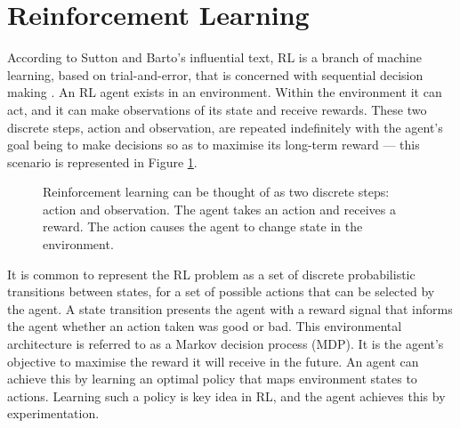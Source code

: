 \section{Reinforcement Learning}\label{sec:reinforcement_learning}
According to Sutton and Barto's influential text, RL is a branch of machine learning, based on trial-and-error, that is concerned with sequential decision making \cite{Sutton2018}. An RL agent exists in an environment. Within the environment it can act, and it can make observations of its state and receive rewards. These two discrete steps, action and observation, are repeated indefinitely with the agent's goal being to make decisions so as to maximise its long-term reward --- this scenario is represented in Figure \ref{fig:209_reinforcement_learning_problem}.

\begin{figure}[h]
	\centering
	
	\caption[Reinforcement learning model overview]{Reinforcement learning can be thought of as two discrete steps: action and observation. The agent takes an action and receives a reward. The action causes the agent to change state in the environment.}
	\label{fig:209_reinforcement_learning_problem}
\end{figure}

It is common to represent the RL problem as a set of discrete probabilistic transitions between states, for a set of possible actions that can be selected by the agent. A state transition presents the agent with a reward signal that informs the agent whether an action taken was good or bad. This environmental architecture is referred to as a Markov decision process (MDP). It is the agent's objective to maximise the reward it will receive in the future. An agent can achieve this by learning an optimal policy that maps environment states to actions. Learning such a policy is key idea in RL, and the agent achieves this by experimentation.


